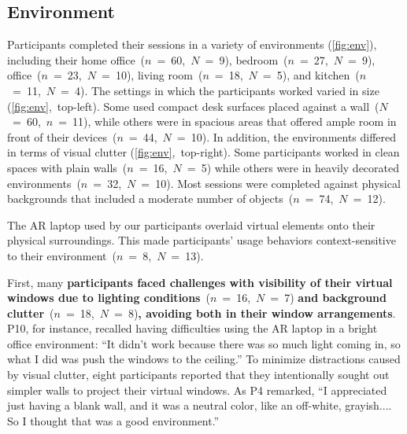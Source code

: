 \subsection{Environment}
\label{sec:environment}
Participants completed their sessions in a variety of environments (\autoref{fig:env}), including
their home office~($n$~=~60,~$N$~=~9), 
bedroom~($n$~=~27,~$N$~=~9), 
office~($n$~=~23,~$N$~=~10),
living room~($n$~=~18,~$N$~=~5), 
and kitchen~($n$~=~11,~$N$~=~4).
The settings in which the participants worked varied in size (\autoref{fig:env},~top-left). 
Some used compact desk surfaces placed against a wall~($N$~=~60,~$n$~=~11), 
while others were in spacious areas that offered ample room in front of their devices~($n$~=~44,~$N$~=~10).
In addition, the environments differed in terms of visual clutter (\autoref{fig:env},~top-right). 
Some participants worked in clean spaces with plain walls~($n$~=~16,~$N$~=~5) 
while others were in heavily decorated environments~($n$~=~32,~$N$~=~10). 
Most sessions were completed against physical backgrounds that included a moderate number of objects~($n$~=~74,~$N$~=~12).

The AR laptop used by our participants overlaid virtual elements onto their physical surroundings. 
This made participants' usage behaviors context-sensitive to their environment~($n$~=~8,~$N$~=~13).

First, many \textbf{participants faced challenges with visibility of their virtual windows due to lighting conditions}~($n$~=~16,~$N$~=~7) \textbf{and background clutter}~($n$~=~18,~$N$~=~8)\textbf{, 
avoiding both in their window arrangements}.
P10, for instance, recalled having difficulties using the AR laptop in a bright office environment: ``It didn't work because there was so much light coming in, so what I did was push the windows to the ceiling.''
To minimize distractions caused by visual clutter, 
eight participants
reported that they intentionally sought out simpler walls to project their virtual windows.  
As P4 remarked, ``I appreciated just having a blank wall, and it was a neutral color, like an off-white, grayish.... So I thought that was a good environment.''

